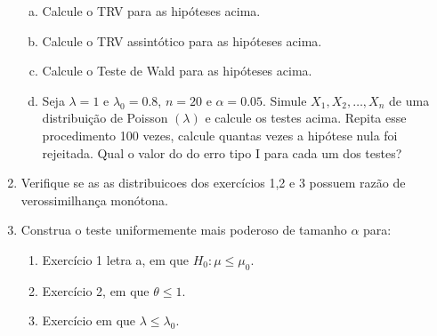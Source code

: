 \documentclass[10pt,brazil,addpoints]{exam}
\begin{document}
\begin{enumerate}[1.]
\begin{enumerate}[a)]
\item Calcule o TRV para as hipóteses acima.

\item Calcule o TRV assintótico para as hipóteses acima. 

\item Calcule o Teste de Wald para as hipóteses acima.

\item Seja $\lambda=1$ e $\lambda_0=0.8$, $n=20$ e $\alpha=0.05$. Simule $X_1, X_2, \ldots, X_n$ de uma distribuição de Poisson $(\lambda)$ e calcule os testes acima. Repita esse procedimento 100 vezes, calcule quantas vezes a hipótese nula foi rejeitada. Qual o valor do do erro tipo I para cada um dos testes?
\end{enumerate}

\item Verifique se as as distribuicoes dos exercícios 1,2 e 3 possuem razão de verossimilhança monótona. 

\item Construa o teste uniformemente mais poderoso de tamanho $\alpha$ para:

\begin{enumerate}
    \item Exercício 1 letra a, em que $H_0: \mu \leq \mu_0$.
    
    \item Exercício 2, em que $\theta \leq 1$.
    
    \item Exercício em que $\lambda \leq \lambda_0$.
\end{enumerate}



\end{enumerate}
\end{document}
